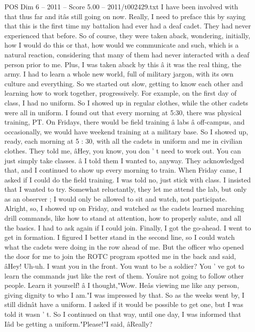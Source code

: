 \begin{textsample}{POS Dim 6 – 2011 – Score 5.00 – 2011/t002429.txt}
I have been involved with that thus far and itâs still going on now.
Really, I need to preface this by saying that this is the first time my battalion had ever had a deaf cadet.
They had never experienced that before.
So of course, they were taken aback, wondering, initially, how I would do this or that, how would we communicate and such, which is a natural reaction, considering that many of them had never interacted with a deaf person prior to me.
Plus, I was taken aback by this â it was the real thing, the army.
I had to learn a whole new world, full of military jargon, with its own culture and everything.
So we started out slow, getting to know each other and learning how to work together, progressively.
For example, on the first day of class, I had no uniform.
So I showed up in regular clothes, while the other cadets were all in uniform.
I found out that every morning at 5:30, there was physical training, PT.
On Fridays, there would be field training â labs â off-campus, and occasionally, we would have weekend training at a military base.
So I showed up, ready, each morning at 5 : 30, with all the cadets in uniform and me in civilian clothes.
They told me, âHey, you know, you don ' t need to work out.
You can just simply take classes. â I told them I wanted to, anyway.
They acknowledged that, and I continued to show up every morning to train.
When Friday came, I asked if I could do the field training.
I was told no, just stick with class.
I insisted that I wanted to try.
Somewhat reluctantly, they let me attend the lab, but only as an observer ; I would only be allowed to sit and watch, not participate.
Alright, so, I showed up on Friday, and watched as the cadets learned marching drill commands, like how to stand at attention, how to properly salute, and all the basics.
I had to ask again if I could join.
Finally, I got the go-ahead.
I went to get in formation.
I figured I better stand in the second line, so I could watch what the cadets were doing in the row ahead of me.
But the officer who opened the door for me to join the ROTC program spotted me in the back and said, âHey!
Uh-uh.
I want you in the front.
You want to be a soldier?
You ' ve got to learn the commands just like the rest of them.
Youâre not going to follow other people.
Learn it yourself! â I thought,"Wow.
Heâs viewing me like any person, giving dignity to who I am."I was impressed by that.
So as the weeks went by, I still didnât have a uniform.
I asked if it would be possible to get one, but I was told it wasn ' t.
So I continued on that way, until one day, I was informed that Iâd be getting a uniform."Please!"I said, âReally?

\end{textsample}
